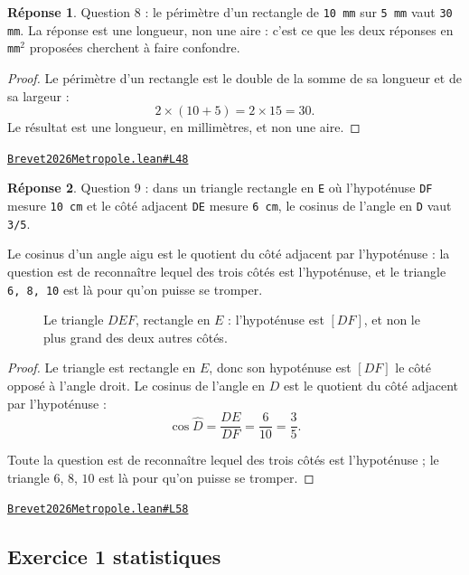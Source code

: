 \documentclass[11pt,a4paper]{article}
\theoremstyle{definition}
\theoremstyle{plain}
\theoremstyle{definition}
\newtheorem*{reponse}{Réponse}
\newcommand{\source}[2]{\par\smallskip\noindent\hfill{\footnotesize\href{#1}{\texttt{#2}}}\par\smallskip}
\begin{document}
\begin{reponse}
Question 8 : le périmètre d'un rectangle de \texttt{10 mm} sur \texttt{5 mm} vaut \texttt{30 mm}.
La réponse est une longueur, non une aire : c'est ce que les deux réponses en
\texttt{mm\(^{2}\)} proposées cherchent à faire confondre.
\end{reponse}
\begin{proof}
Le périmètre d'un rectangle est le double de la somme de sa longueur et de sa largeur :
\[ 2 \times (10 + 5) = 2 \times 15 = 30 . \]
Le résultat est une longueur, en millimètres, et non une aire.
\end{proof}
\source{https://github.com/Commutator-IO/learn-lean/blob/main/exams/2026/Brevet2026Metropole.lean\#L48}{Brevet2026Metropole.lean\#L48}

\begin{reponse}
Question 9 : dans un triangle rectangle en \texttt{E} où l'hypoténuse \texttt{DF} mesure
\texttt{10 cm} et le côté adjacent \texttt{DE} mesure \texttt{6 cm}, le cosinus de l'angle en \texttt{D} vaut
\texttt{3/5}.

Le cosinus d'un angle aigu est le quotient du côté adjacent par l'hypoténuse : la
question est de reconnaître lequel des trois côtés est l'hypoténuse, et le triangle
\texttt{6, 8, 10} est là pour qu'on puisse se tromper.
\end{reponse}

\begin{figure}[h]
\centering

\caption{Le triangle \(DEF\), rectangle en \(E\) : l'hypoténuse est \([DF]\), et non le plus grand des deux autres côtés.}
\end{figure}
\begin{proof}
Le triangle est rectangle en $E$, donc son hypoténuse est $[DF]$ \textemdash{} le côté
opposé à l'angle droit. Le cosinus de l'angle en $D$ est le quotient du côté adjacent par
l'hypoténuse :
\[ \cos \widehat{D} = \frac{DE}{DF} = \frac{6}{10} = \frac{3}{5} . \]

Toute la question est de reconnaître lequel des trois côtés est l'hypoténuse ; le triangle
$6$, $8$, $10$ est là pour qu'on puisse se tromper.
\end{proof}
\source{https://github.com/Commutator-IO/learn-lean/blob/main/exams/2026/Brevet2026Metropole.lean\#L58}{Brevet2026Metropole.lean\#L58}

\subsection{Exercice 1 \textemdash{} statistiques}
\end{document}
